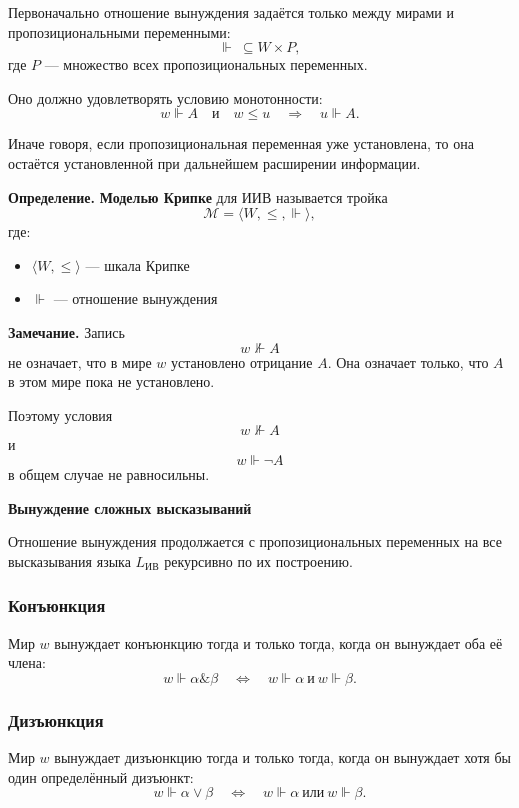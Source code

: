 \documentclass[12pt,a4paper,oneside,openany]{book}
\theoremstyle{definition}
\theoremstyle{plain}
\theoremstyle{remark}
\begin{document}
Первоначально отношение вынуждения задаётся только между мирами и
пропозициональными переменными:
\[
{\Vdash}\ \subseteq W\times P,
\]
где \(P\) --- множество всех пропозициональных переменных.

Оно должно удовлетворять условию монотонности:
\[
w\Vdash A
\quad\text{и}\quad
w\leqslant u
\quad\Longrightarrow\quad
u\Vdash A.
\]

Иначе говоря, если пропозициональная переменная уже установлена, то
она остаётся установленной при дальнейшем расширении информации.

\textbf{Определение.}
\textbf{Моделью Крипке} для ИИВ называется тройка
\[
\mathcal M
=
\langle W,\leqslant,\Vdash\rangle,
\]
где:

\begin{itemize}
    \item \(\langle W,\leqslant\rangle\) --- шкала Крипке
    \item \(\Vdash\) ---  отношение вынуждения
\end{itemize}

\textbf{Замечание.}
Запись
\[
w\nVdash A
\]
не означает, что в мире \(w\) установлено отрицание \(A\). Она
означает только, что \(A\) в этом мире пока не установлено.

Поэтому условия
\[
w\nVdash A
\]
и
\[
w\Vdash\neg A
\]
в общем случае не равносильны.

\textbf{Вынуждение сложных высказываний}

Отношение вынуждения продолжается с пропозициональных переменных на
все высказывания языка \(L_{\mathrm{ИВ}}\) рекурсивно по их
построению.

\subsubsection{Конъюнкция}

Мир \(w\) вынуждает конъюнкцию тогда и только тогда, когда он
вынуждает оба её члена:
\[
w\Vdash\alpha\mathbin{\&}\beta
\quad\Longleftrightarrow\quad
w\Vdash\alpha
\ \text{и}\
w\Vdash\beta.
\]

\subsubsection{Дизъюнкция}

Мир \(w\) вынуждает дизъюнкцию тогда и только тогда, когда он
вынуждает хотя бы один определённый дизъюнкт:
\[
w\Vdash\alpha\lor\beta
\quad\Longleftrightarrow\quad
w\Vdash\alpha
\ \text{или}\
w\Vdash\beta.
\]
\end{document}
